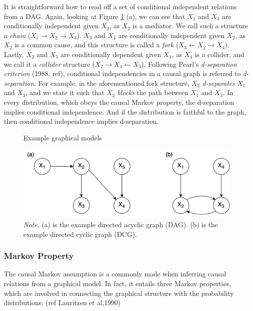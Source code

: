 \documentclass[11pt]{article}
\theoremstyle{definition}
\begin{document}
It is straightforward how to read off a set of conditional independent relations from a DAG. Again, looking at Figure \ref{fig:1} (a), we can see that $X_1$ and $X_3$ are conditionally independent given $X_2$, as $X_2$ is a mediator. We call such a structure a \textit{chain} ($X_1 \rightarrow X_2 \rightarrow X_3$). $X_3$ and $X_4$ are conditionally independent given $X_2$, as $X_2$ is a common cause, and this structure is called a \textit{fork} ($X_3 \leftarrow X_2 \rightarrow X_4$). Lastly, $X_2$ and $X_5$ are conditionally dependent given $X_4$, as $X_4$ is a collider, and we call it a \textit{collider} structure ($X_2 \rightarrow X_4 \leftarrow X_5$). Following Pearl's \textit{d-separation criterion} (1988, ref), conditional independencies in a causal graph is referred to \textit{d-separation}. For example, in the aforementioned fork structure, $X_2$ \textit{d-separates} $X_1$ and $X_3$, and we state it such that $X_2$ \textit{blocks} the path between $X_1$ and $X_3$. In every distribution, which obeys the causal Markov property, the d-separation implies conditional independence. And if the distribution is faithful to the graph, then conditional independence implies d-separation. 

\begin{figure}[H]
    \centering
        \caption{Example graphical models}
        \includegraphics[scale=.5]{figures/DAG_DCG.png}
        \vspace{3mm}
        \caption*{\textit{Note.} (a) is the example directed acyclic graph (DAG). (b) is the example directed cyclic graph (DCG).}
    \label{fig:1}
\end{figure}

\subsubsection{Markov Property} \label{markov_property}
The causal Markov assumption is a commonly made when inferring causal relations from a graphical model. In fact, it entails three Markov properties, which are involved in connecting the graphical structure with the probability distributions: (ref Lauritzen et al,1990)
\end{document}

